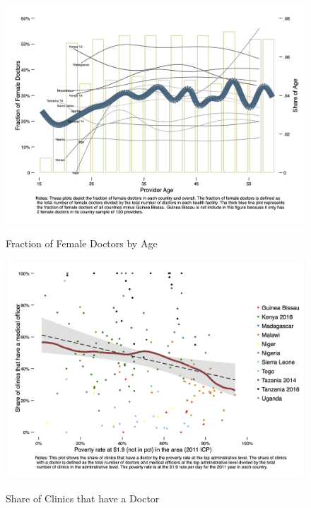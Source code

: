 \documentclass{article}                 %
\begin{document}
			\begin{figure}[H] 
				\centering
				\caption{Fraction of Female Doctors by Age} 
						\includegraphics[width=\textwidth]{"../Output/Final/Line plots/med_fem_frac"}
						\label{fem_doc}
			\end{figure}			
			
			\begin{figure}[H] 
				\centering
				\caption{Share of Clinics that have a Doctor} 
						\includegraphics[width=\textwidth]{"../Output/Final/Poverty_medone_allcountries"}
						\label{doc}
			\end{figure}
			
\end{document}
